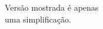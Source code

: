 \documentclass[preview]{standalone}
\begin{document}
Versão mostrada é apenas\\uma simplificação.\\
\end{document}
